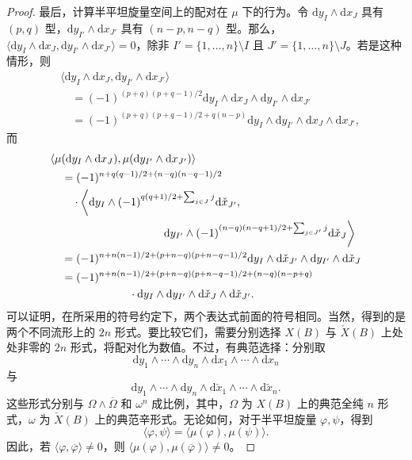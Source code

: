 \begin{proof}
最后，计算半平坦旋量空间上的配对在 $\mu$ 下的行为。令 $\mathrm dy_I\wedge\mathrm dx_J$ 具有 $(p,q)$ 型，$\mathrm dy_{I'}\wedge\mathrm dx_{J'}$ 具有 $(n-p,n-q)$ 型。那么，$\langle\mathrm dy_I\wedge\mathrm dx_J,\mathrm dy_{I'}\wedge\mathrm dx_{J'}\rangle=0$，除非 $I'=\{1,\ldots,n\}\setminus I$ 且 $J'=\{1,\ldots,n\}\setminus J$。若是这种情形，则
\[
\begin{aligned}
&\langle\mathrm dy_I\wedge\mathrm dx_J,\mathrm dy_{I'}\wedge\mathrm dx_{J'}\rangle\\
&\quad=(-1)^{(p+q)(p+q-1)/2}\mathrm dy_I\wedge\mathrm dx_J
\wedge\mathrm dy_{I'}\wedge\mathrm dx_{J'}\\
&\quad=(-1)^{(p+q)(p+q-1)/2+q(n-p)}\mathrm dy_I\wedge\mathrm dy_{I'}
\wedge\mathrm dx_J\wedge\mathrm dx_{J'},
\end{aligned}
\]
而
\[
\begin{aligned}
&\langle\mu(\mathrm dy_I\wedge\mathrm dx_J),
\mu(\mathrm dy_{I'}\wedge\mathrm dx_{J'})\rangle\\
&\quad=(-1)^{n+q(q-1)/2+(n-q)(n-q-1)/2}\\
&\qquad\cdot\left\langle
\mathrm dy_I\wedge(-1)^{q(q+1)/2+\sum_{j\in J}j}\mathrm d\check x_{J'},\right.\\
&\hspace{35mm}\left.
\mathrm dy_{I'}\wedge(-1)^{(n-q)(n-q+1)/2+\sum_{j\in J'}j}\mathrm d\check x_J
\right\rangle\\
&\quad=(-1)^{n+n(n-1)/2+(p+n-q)(p+n-q-1)/2}
\mathrm dy_I\wedge\mathrm d\check x_{J'}\wedge\mathrm dy_{I'}\wedge\mathrm d\check x_J\\
&\quad=(-1)^{n+n(n-1)/2+(p+n-q)(p+n-q-1)/2+(n-q)(n-p+q)}\\
&\hspace{25mm}\cdot\mathrm dy_I\wedge\mathrm dy_{I'}
\wedge\mathrm d\check x_J\wedge\mathrm d\check x_{J'}.
\end{aligned}
\]
可以证明，在所采用的符号约定下，两个表达式前面的符号相同。当然，得到的是两个不同流形上的 $2n$ 形式。要比较它们，需要分别选择 $X(B)$ 与 $\check X(B)$ 上处处非零的 $2n$ 形式，将配对化为数值。不过，有典范选择：分别取
\[
\mathrm dy_1\wedge\cdots\wedge\mathrm dy_n\wedge\mathrm dx_1\wedge\cdots\wedge\mathrm dx_n
\]
与
\[
\mathrm dy_1\wedge\cdots\wedge\mathrm dy_n\wedge\mathrm d\check x_1\wedge\cdots\wedge\mathrm d\check x_n.
\]
这些形式分别与 $\Omega\wedge\overline\Omega$ 和 $\omega^n$ 成比例，其中，$\Omega$ 为 $X(B)$ 上的典范全纯 $n$ 形式，$\omega$ 为 $\check X(B)$ 上的典范辛形式。无论如何，对于半平坦旋量 $\varphi,\psi$，得到
\begin{equation}\label{eq:6.2}
\langle\varphi,\psi\rangle=\langle\mu(\varphi),\mu(\psi)\rangle.
\end{equation}
因此，若 $\langle\varphi,\overline\varphi\rangle\ne0$，则 $\langle\mu(\varphi),\mu(\overline\varphi)\rangle\ne0$。
\end{proof}

